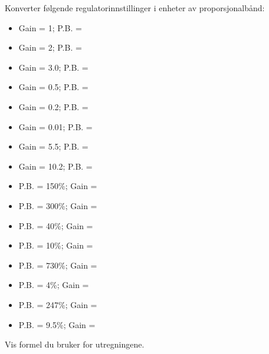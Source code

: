 

Konverter følgende regulatorinnstillinger i enheter av proporsjonalbånd:
\begin{multicols}{2}
\begin{itemize}
\item{}Gain = 1; P.B. = \underbar{\hskip 50pt}
\vskip 5pt
\item{}Gain = 2; P.B. = \underbar{\hskip 50pt} 
\vskip 5pt
\item{}Gain = 3.0; P.B. = \underbar{\hskip 50pt} 
\vskip 5pt
\item{}Gain = 0.5; P.B. = \underbar{\hskip 50pt}
\vskip 5pt
\item{}Gain = 0.2; P.B. = \underbar{\hskip 50pt} 
\vskip 5pt
\item{}Gain = 0.01; P.B. = \underbar{\hskip 50pt} 
\vskip 5pt
\item{}Gain = 5.5; P.B. = \underbar{\hskip 50pt} 
\vskip 5pt
\item{}Gain = 10.2; P.B. = \underbar{\hskip 50pt} 
\end{itemize} 



\begin{itemize}
\item{}P.B. = 150\%; Gain = \underbar{\hskip 50pt}
\vskip 5pt
\item{}P.B. = 300\%; Gain = \underbar{\hskip 50pt} 
\vskip 5pt
\item{}P.B. = 40\%; Gain = \underbar{\hskip 50pt} 
\vskip 5pt
\item{}P.B. = 10\%; Gain = \underbar{\hskip 50pt} 
\vskip 5pt
\item{}P.B. = 730\%; Gain = \underbar{\hskip 50pt} 
\vskip 5pt
\item{}P.B. = 4\%; Gain = \underbar{\hskip 50pt} 
\vskip 5pt
\item{}P.B. = 247\%; Gain = \underbar{\hskip 50pt} 
\vskip 5pt
\item{}P.B. = 9.5\%; Gain = \underbar{\hskip 50pt} 
\end{itemize} 
\end{multicols}

\vskip 5pt 
Vis formel du bruker for utregningene.
\vskip 5pt 
\vfil \eject





